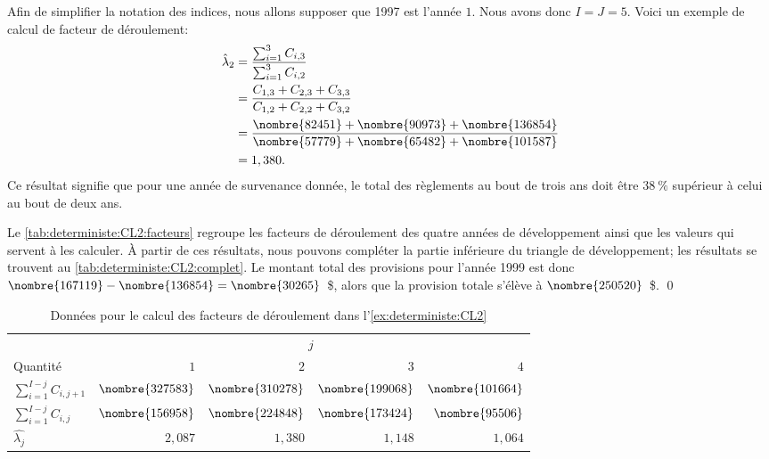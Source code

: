\begin{exemple}
  Afin de simplifier la notation des indices, nous allons supposer que
  1997 est l'année $1$. Nous avons donc $I = J = 5$. Voici un
  exemple de calcul de facteur de déroulement:
  \begin{align*}
    \hat{\lambda}_2
    &= \frac{\sum_{i = 1}^3 C_{i, 3}}{\sum_{i = 1}^3 C_{i, 2}}\\
    &= \frac{C_{1, 3}+ C_{2, 3}+ C_{3, 3}}{C_{1, 2}+ C_{2, 2}+ C_{3, 2}} \\
    &= \frac{\nombre{82451} + \nombre{90973} +
      \nombre{136854}}{\nombre{57779} + \nombre{65482} +
      \nombre{101587}} \\
    &= 1,380.
  \end{align*}
  Ce résultat signifie que pour une année de survenance donnée, le
  total des règlements au bout de trois ans doit être $38~\%$
  supérieur à celui au bout de deux ans.

  Le \autoref{tab:deterministe:CL2:facteurs} regroupe les facteurs de
  déroulement des quatre années de développement ainsi que les valeurs
  qui servent à les calculer. À partir de ces résultats, nous pouvons
  compléter la partie inférieure du triangle de développement; les
  résultats se trouvent au \autoref{tab:deterministe:CL2:complet}. Le
  montant total des provisions pour l'année 1999 est donc
  $\nombre{167119} - \nombre{136854} = \nombre{30265}$~\$, alors que
  la provision totale s'élève à $\nombre{250520}$~\$. %
  \qed

  \begin{table}
    \centering
    \caption{Données pour le calcul des facteurs de déroulement dans
      l'\autoref{ex:deterministe:CL2}}
    \label{tab:deterministe:CL2:facteurs}
    \begin{tabular}{lrrrr}
      \toprule
      & \multicolumn{4}{c}{$j$} \\
      Quantité & $1$ & $2$ & $3$ & $4$ \\
      \midrule
      $\sum_{i=1}^{I - j} C_{i, j+1}$ & $\nombre{327583}$ & $\nombre{310278}$ & $\nombre{199068}$ & $\nombre{101664}$ \\
      $\sum_{i = 1}^{I - j} C_{i, j}$ & $\nombre{156958}$ & $\nombre{224848}$ & $\nombre{173424}$ & $\nombre{95506}$ \\
      $\hat{\lambda_j}$ & $2,087$ & $1,380$ & $1,148$ & $1,064$ \\
      \bottomrule
    \end{tabular}
  \end{table}


\end{exemple}
